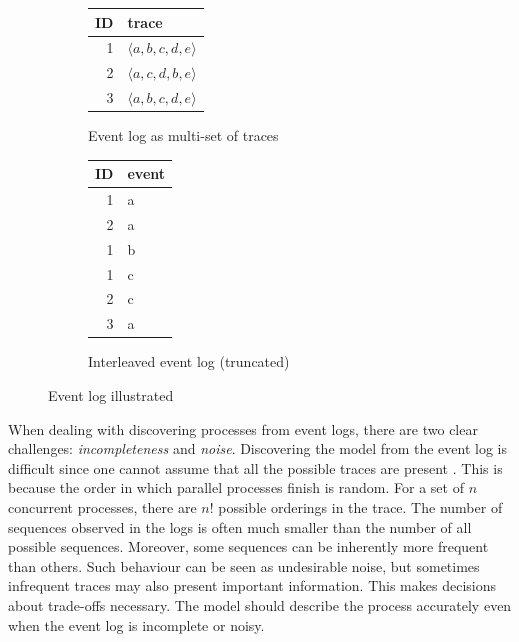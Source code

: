 \begin{figure}[htb]
    \centering
    \begin{subfigure}[h]{0.4\linewidth}
        \begin{center}
        \begin{tabular}{r | l}
        ID & trace\\
        \hline
        1 & $\langle a,b,c,d,e \rangle$ \\
        2 & $\langle a,c,d,b,e \rangle$ \\
        3 & $\langle a,b,c,d,e \rangle$ \\
        \end{tabular}
        \end{center}
        \caption{Event log as multi-set of traces}
        \label{tab:multisettrace}
    \end{subfigure}
    \begin{subfigure}[h]{0.4\linewidth}
        \begin{center}
        \begin{tabular}{r | l}
        ID & event\\
        \hline
        1 & a \\
        2 & a \\
        1 & b \\
        1 & c \\
        2 & c \\
        3 & a \\
        \end{tabular}
        \end{center}
        \caption{Interleaved event log (truncated)}
        \label{tab:interleaved}
    \end{subfigure}
    \caption{Event log illustrated}
\end{figure}

When dealing with discovering processes from event logs, there are two clear challenges: \emph{incompleteness} and \emph{noise}. 
Discovering the model from the event log is difficult since one cannot assume that all the possible traces are present \cite{van2013discovering}. 
This is because the order in which parallel processes finish is random. 
For a set of $n$ concurrent processes, there are $n!$ possible orderings in the trace.
The number of sequences observed in the logs \cite{van2007business} is often much smaller than the number of all possible sequences.
Moreover, some sequences can be inherently more frequent than others. 
Such behaviour can be seen as undesirable noise, but sometimes infrequent traces may also present important information.
This makes decisions about trade-offs necessary. 
The model should describe the process accurately even when the event log is incomplete or noisy.


